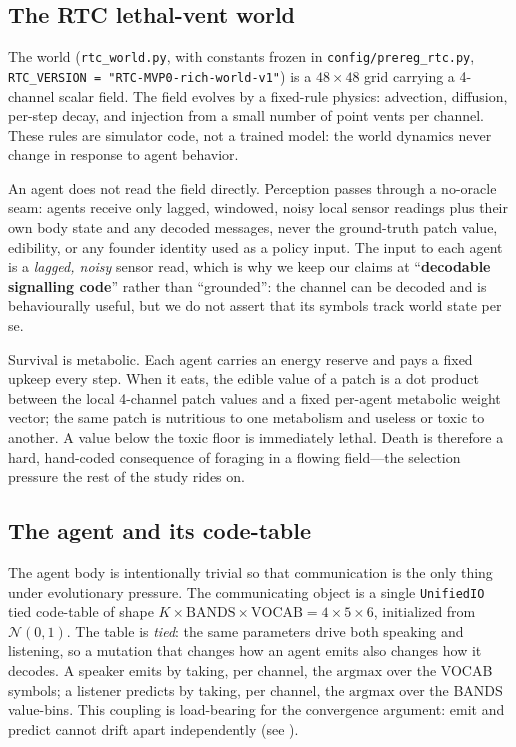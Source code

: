 \documentclass[12pt,letterpaper]{article}
\begin{document}
\subsection{The RTC lethal-vent world}

The world (\texttt{rtc\_world.py}, with constants frozen in \texttt{config/prereg\_rtc.py},
\texttt{RTC\_VERSION = "RTC-MVP0-rich-world-v1"}) is a $48\times 48$ grid carrying a
4-channel scalar field. The field evolves by a fixed-rule physics: advection, diffusion,
per-step decay, and injection from a small number of point vents per channel. These rules
are simulator code, not a trained model: the world dynamics never change in response to
agent behavior.

An agent does not read the field directly. Perception passes through a no-oracle seam:
agents receive only lagged, windowed, noisy local sensor readings plus their own body state
and any decoded messages, never the ground-truth patch value, edibility, or any founder
identity used as a policy input. The input to each agent is a \emph{lagged, noisy} sensor
read, which is why we keep our claims at ``\textbf{decodable signalling code}'' rather than
``grounded'': the channel can be decoded and is behaviourally useful, but we do not assert
that its symbols track world state per se.

Survival is metabolic. Each agent carries an energy reserve and pays a fixed upkeep every
step. When it eats, the edible value of a patch is a dot product between the local 4-channel
patch values and a fixed per-agent metabolic weight vector; the same patch is nutritious to
one metabolism and useless or toxic to another. A value below the toxic floor is immediately
lethal. Death is therefore a hard, hand-coded consequence of foraging in a flowing
field---the selection pressure the rest of the study rides on.

\subsection{The agent and its code-table}

The agent body is intentionally trivial so that communication is the only thing under
evolutionary pressure. The communicating object is a single \texttt{UnifiedIO} tied
code-table of shape $K \times \text{BANDS} \times \text{VOCAB} = 4 \times 5 \times 6$,
initialized from $\mathcal{N}(0,1)$. The table is \emph{tied}: the same parameters drive
both speaking and listening, so a mutation that changes how an agent emits also changes how
it decodes. A speaker emits by taking, per channel, the $\text{argmax}$ over the VOCAB
symbols; a listener predicts by taking, per channel, the $\text{argmax}$ over the BANDS
value-bins. This coupling is load-bearing for the convergence argument: emit and predict
cannot drift apart independently (see ).
\end{document}
